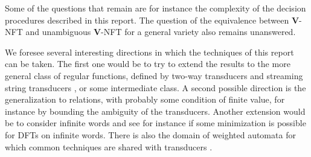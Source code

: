 \documentclass[12pt]{report}
\theoremstyle{definition}
\theoremstyle{remark}
\begin{document}
Some of the questions that remain are for instance the complexity of the decision procedures described in this report.
The question of the equivalence between \textbf V-NFT and unambiguous \textbf V-NFT for a general variety also remains unanswered. 

We foresee several interesting directions in which the techniques of this report can be taken.
The first one would be to try to extend the results to the more general class of regular functions, defined by two-way transducers \cite{engelfrieth01} and streaming string transducers \cite{alurc10}, or some intermediate class.
A second possible direction is the generalization to relations, with probably some condition of finite value, for instance by bounding the ambiguity of the transducers.
Another extension would be to consider infinite words and see for instance if some minimization is possible for DFTs on infinite words.
There is also the domain of weighted automata for which common techniques are shared with transducers \cite{filiotgr14}.





\end{document}
